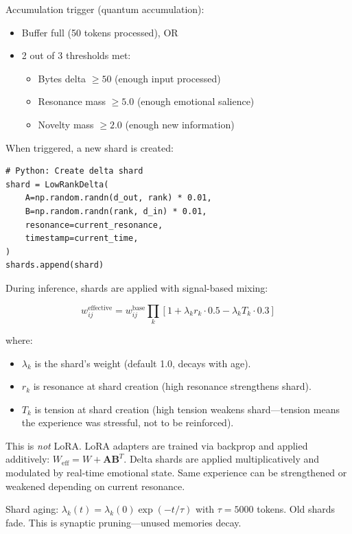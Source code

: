 \documentclass[11pt,a4paper]{article}
\begin{document}
Accumulation trigger (quantum accumulation):

\begin{itemize}
\item Buffer full (50 tokens processed), OR
\item 2 out of 3 thresholds met:
  \begin{itemize}
  \item Bytes delta $\geq 50$ (enough input processed)
  \item Resonance mass $\geq 5.0$ (enough emotional salience)
  \item Novelty mass $\geq 2.0$ (enough new information)
  \end{itemize}
\end{itemize}

When triggered, a new shard is created:

\begin{verbatim}
# Python: Create delta shard
shard = LowRankDelta(
    A=np.random.randn(d_out, rank) * 0.01,
    B=np.random.randn(rank, d_in) * 0.01,
    resonance=current_resonance,
    timestamp=current_time,
)
shards.append(shard)
\end{verbatim}

During inference, shards are applied with signal-based mixing:

\begin{equation}
w_{ij}^{\text{effective}} = w_{ij}^{\text{base}} \prod_k \left[ 1 + \lambda_k r_k \cdot 0.5 - \lambda_k T_k \cdot 0.3 \right]
\end{equation}

where:

\begin{itemize}
\item $\lambda_k$ is the shard's weight (default 1.0, decays with age).
\item $r_k$ is resonance at shard creation (high resonance strengthens shard).
\item $T_k$ is tension at shard creation (high tension weakens shard—tension means the experience was stressful, not to be reinforced).
\end{itemize}

This is \textit{not} LoRA. LoRA adapters are trained via backprop and applied additively: $W_{\text{eff}} = W + \mathbf{A}\mathbf{B}^T$. Delta shards are applied multiplicatively and modulated by real-time emotional state. Same experience can be strengthened or weakened depending on current resonance.

Shard aging: $\lambda_k(t) = \lambda_k(0) \exp(-t / \tau)$ with $\tau = 5000$ tokens. Old shards fade. This is synaptic pruning—unused memories decay.
\end{document}
